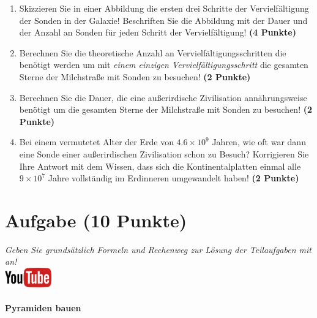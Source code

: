 \documentclass[a4paper, 9pt]{scrartcl}\usepackage[]{graphicx}\usepackage[]{xcolor}
\begin{document}
\begin{enumerate}
\item Skizzieren Sie in einer Abbildung die ersten drei Schritte der
  Vervielf{\"a}ltigung der Sonden in der Galaxie! Beschriften Sie die Abbildung
  mit der Dauer und der Anzahl an Sonden f{\"u}r jeden Schritt der Vervielf{\"a}ltigung! \textbf{(4 Punkte)}
\item Berechnen Sie die theoretische Anzahl an Vervielf{\"a}ltigungsschritten die
  ben{\"o}tigt werden um mit \textit{einem einzigen Vervielf{\"a}ltigungsschritt} die
  gesamten Sterne der Milchstra{\ss}e mit Sonden zu besuchen! \textbf{(2 Punkte)}
\item Berechnen Sie die Dauer, die eine au{\ss}erirdische Zivilisation
  ann{\"a}hrungsweise ben{\"o}tigt um die gesamten Sterne der Milchstra{\ss}e mit
  Sonden zu besuchen! \textbf{(2 Punkte)}
\item Bei einem vermutetet Alter der Erde von $\ensuremath{4.6\times 10^{9}}$ Jahren,
  wie oft war dann eine Sonde einer au{\ss}erirdischen Zivilisation schon zu
  Besuch? Korrigieren Sie Ihre Antwort mit dem Wissen, dass sich die
  Kontinentalplatten einmal alle $\ensuremath{9\times 10^{7}}$ Jahre vollst{\"a}ndig im
  Erdinneren umgewandelt haben! \textbf{(2 Punkte)}
\end{enumerate}


 
\clearpage

\section{Aufgabe \hfill (10 Punkte)}

\textit{Geben Sie grunds{\"a}tzlich Formeln und Rechenweg zur L{\"o}sung der
  Teilaufgaben mit an!} \\[1Ex]

\hfill\href{https://youtu.be/tDgr6fpkkYA}{\includegraphics[width =
  2cm]{img/youtube}} %
\hspace{2Ex}

\paragraph{Pyramiden bauen}
\end{document}
